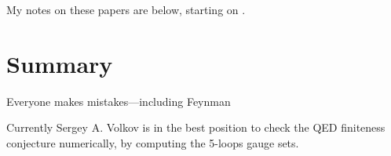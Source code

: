 My notes on these papers are below, starting on .

    

\section{Summary}
\label{sect:Summary}

\begin{bartlett}{
{Everyone makes mistakes—including {Feynman}}
        }
\end{bartlett}
\bigskip

\noindent
Currently Sergey  A. Volkov is in the best position to check the QED
finiteness conjecture numerically, by computing the 5-loops gauge sets.


